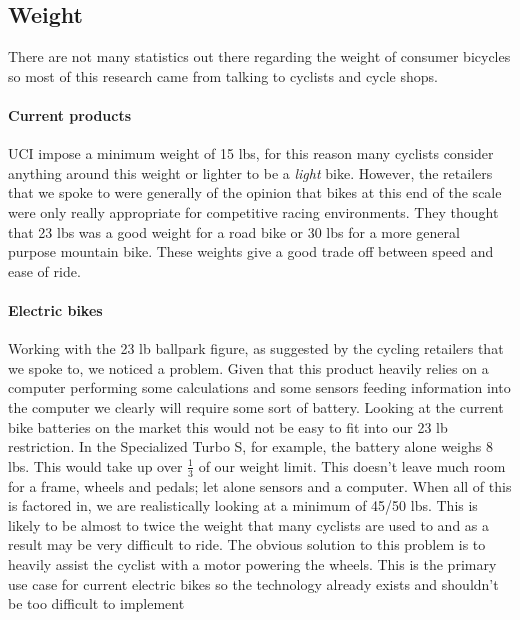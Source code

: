 \documentclass[a4paper]{report}
\begin{document}
\subsection{Weight}
There are not many statistics out there regarding the weight of consumer bicycles so most of this research came from talking to cyclists and cycle shops.
\paragraph{Current products}
UCI impose a minimum weight of 15 lbs, for this reason many cyclists consider anything around this weight or lighter to be a \textit{light} bike. However, the retailers that we spoke to were generally of the opinion that bikes at this end of the scale were only really appropriate for competitive racing environments. They thought that 23 lbs was a good weight for a road bike or 30 lbs for a more general purpose mountain bike. These weights give a good trade off between speed and ease of ride.

\paragraph{Electric bikes}
Working with the 23 lb ballpark figure, as suggested by the cycling retailers that we spoke to, we noticed a problem. Given that this product heavily relies on a computer performing some calculations and some sensors feeding information into the computer we clearly will require some sort of battery. Looking at the current bike batteries on the market this would not be easy to fit into our 23 lb restriction. In the Specialized Turbo S, for example, the battery alone weighs 8 lbs\cite{turbo-s}. This would take up over $ \frac{1}{3} $ of our weight limit. This doesn't leave much room for a frame, wheels and pedals; let alone sensors and a computer. When all of this is factored in, we are realistically looking at a minimum of 45/50 lbs. This is likely to be almost to twice the weight that many cyclists are used to and as a result may be very difficult to ride. The obvious solution to this problem is to heavily assist the cyclist with a motor powering the wheels. This is the primary use case for current electric bikes so the technology already exists and shouldn't be too difficult to implement
\end{document}
